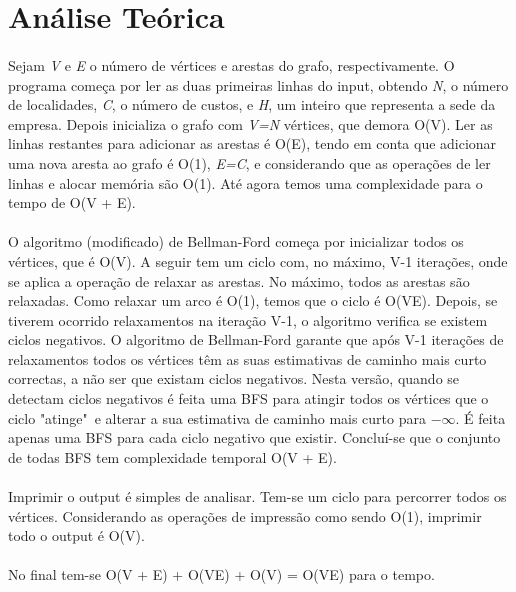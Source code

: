 \documentclass[12pt, a4paper]{article}
\begin{document}
\section{Análise Teórica}
\paragraph{}
Sejam \textit{V} e \textit{E} o número de vértices e arestas do grafo,
respectivamente.  O programa começa por ler as duas primeiras linhas do input,
obtendo \textit{N}, o número de localidades, \textit{C}, o número de custos, e
\textit{H}, um inteiro que representa a sede da empresa. Depois inicializa o
grafo com \textit{V=N} vértices, que demora O(V). Ler as linhas
restantes para adicionar as arestas é O(E), tendo em conta que
adicionar uma nova aresta ao grafo é O(1), \textit{E=C}, e considerando
que as operações de ler linhas e alocar memória são O(1). Até agora
temos uma complexidade para o tempo de O(V + E).

\paragraph{}
O algoritmo (modificado) de Bellman-Ford começa por inicializar todos os
vértices, que é O(V). A seguir tem um ciclo com, no máximo,
V-1 iterações, onde se aplica a operação de relaxar as arestas. No
máximo, todos as arestas são relaxadas. Como relaxar um arco é O(1),
temos que o ciclo é O(VE). Depois, se tiverem ocorrido relaxamentos na
iteração V-1, o algoritmo verifica se existem ciclos negativos. O
algoritmo de Bellman-Ford garante que após V-1 iterações de
relaxamentos todos os vértices têm as suas estimativas de caminho mais curto
correctas, a não ser que existam ciclos negativos. Nesta versão, quando se
detectam ciclos negativos é feita uma BFS para atingir todos os vértices que o
ciclo "atinge"\ e alterar a sua estimativa de caminho mais curto para $-\infty$.
É feita apenas uma BFS para cada ciclo negativo que existir.  Concluí-se que o
conjunto de todas BFS tem complexidade temporal O(V + E).

\paragraph{}
Imprimir o output é simples de analisar. Tem-se um ciclo para percorrer todos os
vértices. Considerando as operações de impressão como sendo O(1),
imprimir todo o output é O(V).

\paragraph{}
No final tem-se O(V + E) + O(VE) + O(V) = O(VE) para o tempo.
\end{document}
